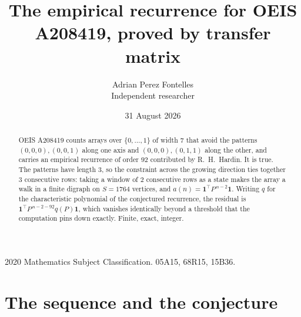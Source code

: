 \documentclass[11pt,a4paper]{article}
\title{The empirical recurrence for OEIS A208419, proved by transfer matrix}
\author{Adrian Perez Fontelles\\ \small Independent researcher}
\date{31 August 2026}
\theoremstyle{plain}
\theoremstyle{definition}
\begin{document}
\maketitle

\begin{abstract}
OEIS A208419 counts arrays over $\{0,\dots,1\}$ of width $7$ that avoid the patterns
$(0,0,0), (0,0,1)$ along one axis and $(0,0,0), (0,1,1)$ along the other, and carries an empirical recurrence of
order $92$ contributed by R.~H.~Hardin. It is true. The patterns have length $3$, so
the constraint across the growing direction ties together $3$ consecutive rows: taking a
window of $2$ consecutive rows as a state makes the array a walk in a finite digraph
on $S=1764$ vertices, and $a(n)=\mathbf{1}^{\!\top}P^{\,n-2}\mathbf{1}$. Writing $q$
for the characteristic polynomial of the conjectured recurrence, the residual is
$\mathbf{1}^{\!\top}P^{\,n-2-92}q(P)\mathbf{1}$, which vanishes identically
beyond a threshold that the computation pins down exactly. Finite, exact, integer.
\end{abstract}

\noindent\small 2020 Mathematics Subject Classification. 05A15, 68R15, 15B36.\normalsize

\section{The sequence and the conjecture}
\end{document}
